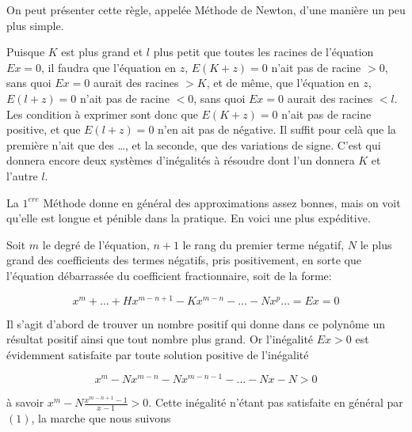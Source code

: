 \documentclass[11pt]{article}
\begin{document}
On peut présenter cette règle, appelée Méthode de Newton, d'une manière un peu plus simple.

Puisque $K$ est plus grand et $l$ plus petit que toutes les racines de l'équation $Ex=0$,
il faudra que l'équation en $z$, $E(K+z)=0$ n'ait pas de racine $>0$, sans quoi 
$Ex=0$ aurait des racines $>K$, et de même, que l'équation en $z$, $E(l+z)=0$ 
n'ait pas de racine $<0$, sans quoi $Ex=0$ aurait des racines $<l$. Les condition à
exprimer sont donc que $E(K+z)=0$ n'ait pas de racine positive, et que $E(l+z)=0$
n'en ait pas de négative. Il suffit pour celà que la première n'ait que des
\dots, et la seconde, que des variations de signe. C'est qui donnera encore
deux systèmes d'inégalités à résoudre dont l'un donnera $K$ et l'autre $l$.\newline

\quad{}\newline

La $1^{ere}$ Méthode donne en général des approximations assez bonnes, mais on voit
qu'elle est longue et pénible dans la pratique. En voici une plus expéditive.

Soit $m$ le degré de l'équation, $n+1$ le rang du premier terme négatif, 
$N$ le plus grand des coefficients des termes négatifs, pris positivement, en sorte que
l'équation débarrassée du coefficient fractionnaire, soit de la forme:

\begin{equation}
x^m+\dots+Hx^{m-n+1}-Kx^{m-n}-\dots -Nx^p\dots=Ex=0
\end{equation}

Il s'agit d'abord de trouver un nombre positif qui donne dans ce polynôme un résultat
positif ainsi que tout nombre plus grand. Or l'inégalité $Ex>0$ est évidemment 
satisfaite par toute solution positive de l'inégalité 

\begin{equation}
x^m-Nx^{m-n}-Nx^{m-n-1}-\dots-Nx-N > 0
\end{equation}

à savoir $x^m-N\frac{x^{m-n+1}-1}{x-1} > 0$. Cette inégalité n'étant pas satisfaite en général
par $(1)$, la marche que nous suivons
\end{document}
